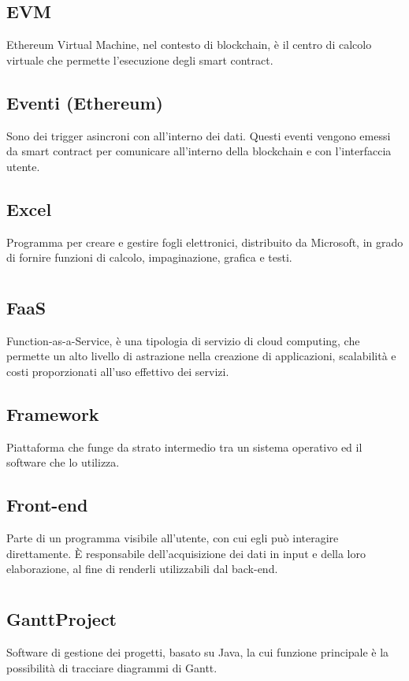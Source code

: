 	\subsection*{EVM}
	Ethereum Virtual Machine, nel contesto di blockchain, è il centro di calcolo virtuale che permette l’esecuzione degli smart contract.
	\subsection*{Eventi (Ethereum)}
	Sono dei trigger asincroni con all’interno dei dati. Questi eventi vengono emessi da smart contract per comunicare all’interno della blockchain e con l’interfaccia utente.
	\subsection*{Excel}
	Programma per creare e gestire fogli elettronici, distribuito da Microsoft, in grado di fornire funzioni di calcolo, impaginazione, grafica e testi.
\pagebreak
\section[F]{}
	\subsection*{FaaS}
	Function-as-a-Service, è una tipologia di servizio di cloud computing, che permette un alto livello di astrazione nella creazione di applicazioni, scalabilità e costi proporzionati all’uso effettivo dei servizi.
	\subsection*{Framework}
	Piattaforma che funge da strato intermedio tra un sistema operativo ed il software che lo utilizza.
	\subsection*{Front-end}
	Parte di un programma visibile all’utente, con cui egli può interagire direttamente. È responsabile dell’acquisizione dei dati in input e della loro elaborazione, al fine di renderli utilizzabili dal back-end.
\pagebreak
\section[G]{}
	\subsection*{GanttProject}
	Software di gestione dei progetti, basato su Java, la cui funzione principale è la possibilità di tracciare diagrammi di Gantt.
